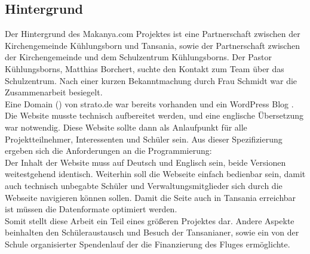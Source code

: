 \subsection{Hintergrund} %
Der Hintergrund des Makanya.com Projektes ist eine Partnerschaft
zwischen der Kirchengemeinde Kühlungsborn und Tansania,
sowie der Partnerschaft zwischen der Kirchengemeinde und dem Schulzentrum Kühlungsborns.
Der Pastor Kühlungsborns, Matthias Borchert,
suchte den Kontakt zum \jf Team über das Schulzentrum.
Nach einer kurzen Bekanntmachung durch Frau Schmidt war die Zusammenarbeit besiegelt.\\
Eine Domain () von strato.de war bereits vorhanden
und ein WordPress Blog .
Die Website musste technisch aufbereitet werden, und eine englische Übersetzung war notwendig.
Diese Website sollte dann als Anlaufpunkt für alle Projektteilnehmer, Interessenten und Schüler sein.
Aus dieser Spezifizierung ergeben sich die Anforderungen an die Programmierung:\\
Der Inhalt der Website muss auf Deutsch und Englisch sein, beide Versionen weitestgehend identisch.
Weiterhin soll die Webseite einfach bedienbar sein,
damit auch technisch unbegabte Schüler und Verwaltungsmitglieder sich durch die Webseite navigieren können sollen.
Damit die Seite auch in Tansania erreichbar ist müssen die Datenformate optimiert werden.\\
Somit stellt diese Arbeit ein Teil eines größeren Projektes dar.
Andere Aspekte beinhalten den Schüleraustausch und Besuch der Tansanianer,
sowie ein von der Schule organisierter Spendenlauf der die Finanzierung des Fluges ermöglichte.

